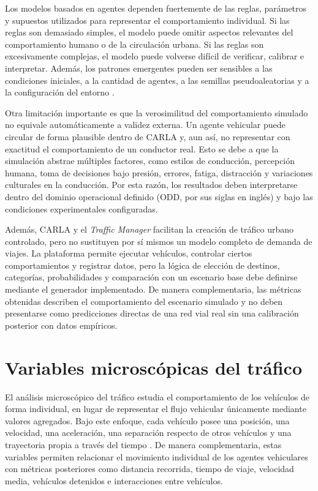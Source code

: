 Los modelos basados en agentes dependen fuertemente de las reglas, parámetros y supuestos utilizados para representar el comportamiento individual. Si las reglas son demasiado simples, el modelo puede omitir aspectos relevantes del comportamiento humano o de la circulación urbana. Si las reglas son excesivamente complejas, el modelo puede volverse difícil de verificar, calibrar e interpretar. Además, los patrones emergentes pueden ser sensibles a las condiciones iniciales, a la cantidad de agentes, a las semillas pseudoaleatorias y a la configuración del entorno \cite{macal2010abms,bonabeau2002abm}.

Otra limitación importante es que la verosimilitud del comportamiento simulado no equivale automáticamente a validez externa. Un agente vehicular puede circular de forma plausible dentro de CARLA y, aun así, no representar con exactitud el comportamiento de un conductor real. Esto se debe a que la simulación abstrae múltiples factores, como estilos de conducción, percepción humana, toma de decisiones bajo presión, errores, fatiga, distracción y variaciones culturales en la conducción. Por esta razón, los resultados deben interpretarse dentro del dominio operacional definido (ODD, por sus siglas en inglés) y bajo las condiciones experimentales configuradas.

Además, CARLA y el \textit{Traffic Manager} facilitan la creación de tráfico urbano controlado, pero no sustituyen por sí mismos un modelo completo de demanda de viajes. La plataforma permite ejecutar vehículos, controlar ciertos comportamientos y registrar datos, pero la lógica de elección de destinos, categorías, probabilidades y comparación con un escenario base debe definirse mediante el generador implementado. De manera complementaria, las métricas obtenidas describen el comportamiento del escenario simulado y no deben presentarse como predicciones directas de una red vial real sin una calibración posterior con datos empíricos.

\section{Variables microscópicas del tráfico}
\label{subsec:variables_microscopicas_trafico}

El análisis microscópico del tráfico estudia el comportamiento de los vehículos de forma individual, en lugar de representar el flujo vehicular únicamente mediante valores agregados. Bajo este enfoque, cada vehículo posee una posición, una velocidad, una aceleración, una separación respecto de otros vehículos y una trayectoria propia a través del tiempo \cite{immers2005trafficflow,fhwa2001trafficflow}. De manera complementaria, estas variables permiten relacionar el movimiento individual de los agentes vehiculares con métricas posteriores como distancia recorrida, tiempo de viaje, velocidad media, vehículos detenidos e interacciones entre vehículos.

